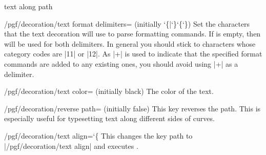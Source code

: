 \begin{decoration}{text along path}
{\begin{key}{/pgf/decoration/text format delimiters= (initially \char`\{|\char`\}\char`\{\char`\})}
        Set the characters that the text decoration will use to parse
        formatting commands. If  is empty, then  will
        be used for both delimiters. In general you should stick to characters
        whose category codes are |11| or |12|. As |+| is used to indicate that
        the specified format commands are added  to any existing ones, you
        should avoid using |+| as a delimiter.
\begin{codeexample}[preamble={\usetikzlibrary{decorations.text}}]
\end{codeexample}
    \end{key}
}

    \begin{key}{/pgf/decoration/text color=  (initially black)}
        The color of the text.
    \end{key}

    \begin{key}{/pgf/decoration/reverse path= (initially false)}
        This key reverses the path. This is especially useful for typesetting
        text along different sides of curves.
\begin{codeexample}[preamble={\usetikzlibrary{decorations.text}}]
\end{codeexample}
    \end{key}

    \begin{key}{/pgf/decoration/text align={\ttfamily\char`\{}}
        This changes the key path to |/pgf/decoration/text align| and executes
        .
    \end{key}


\end{decoration}
